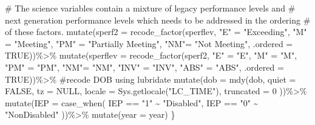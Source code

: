 \documentclass[
  letterpaper,
  DIV=11,
  numbers=noendperiod]{scrartcl}
\newenvironment{Shaded}{\begin{snugshade}}{\end{snugshade}}
\newcommand{\AttributeTok}[1]{\textcolor[rgb]{0.40,0.45,0.13}{#1}}
\newcommand{\CommentTok}[1]{\textcolor[rgb]{0.37,0.37,0.37}{#1}}
\newcommand{\ConstantTok}[1]{\textcolor[rgb]{0.56,0.35,0.01}{#1}}
\newcommand{\DecValTok}[1]{\textcolor[rgb]{0.68,0.00,0.00}{#1}}
\newcommand{\FunctionTok}[1]{\textcolor[rgb]{0.28,0.35,0.67}{#1}}
\newcommand{\NormalTok}[1]{\textcolor[rgb]{0.00,0.23,0.31}{#1}}
\newcommand{\OtherTok}[1]{\textcolor[rgb]{0.00,0.23,0.31}{#1}}
\newcommand{\SpecialCharTok}[1]{\textcolor[rgb]{0.37,0.37,0.37}{#1}}
\newcommand{\StringTok}[1]{\textcolor[rgb]{0.13,0.47,0.30}{#1}}
\begin{document}
\begin{Shaded}
\begin{Highlighting}[]
  \CommentTok{\# The science variables contain a mixture of legacy performance levels and}
  \CommentTok{\# next generation performance levels which needs to be addressed in the ordering}
  \CommentTok{\# of these factors.}
  \FunctionTok{mutate}\NormalTok{(}\AttributeTok{sperf2 =} \FunctionTok{recode\_factor}\NormalTok{(sperflev,}
                                   \StringTok{"E"} \OtherTok{=} \StringTok{"Exceeding"}\NormalTok{,}
                                   \StringTok{"M"} \OtherTok{=} \StringTok{"Meeting"}\NormalTok{,}
                                   \StringTok{"PM"} \OtherTok{=} \StringTok{"Partially Meeting"}\NormalTok{,}
                                   \StringTok{"NM"}\OtherTok{=} \StringTok{"Not Meeting"}\NormalTok{,}
                                  \AttributeTok{.ordered =} \ConstantTok{TRUE}\NormalTok{))}\SpecialCharTok{\%\textgreater{}\%}
  \FunctionTok{mutate}\NormalTok{(}\AttributeTok{sperflev =} \FunctionTok{recode\_factor}\NormalTok{(sperf2,}
                                   \StringTok{"E"} \OtherTok{=} \StringTok{"E"}\NormalTok{,}
                                   \StringTok{"M"} \OtherTok{=} \StringTok{"M"}\NormalTok{,}
                                   \StringTok{"PM"} \OtherTok{=} \StringTok{"PM"}\NormalTok{,}
                                   \StringTok{"NM"}\OtherTok{=} \StringTok{"NM"}\NormalTok{,}
                                   \StringTok{"INV"} \OtherTok{=} \StringTok{"INV"}\NormalTok{,}
                                   \StringTok{"ABS"} \OtherTok{=} \StringTok{"ABS"}\NormalTok{,}
                                  \AttributeTok{.ordered =} \ConstantTok{TRUE}\NormalTok{))}\SpecialCharTok{\%\textgreater{}\%}
  \CommentTok{\#recode DOB using lubridate}
  \FunctionTok{mutate}\NormalTok{(}\AttributeTok{dob =} \FunctionTok{mdy}\NormalTok{(dob,}
  \AttributeTok{quiet =} \ConstantTok{FALSE}\NormalTok{,}
  \AttributeTok{tz =} \ConstantTok{NULL}\NormalTok{,}
  \AttributeTok{locale =} \FunctionTok{Sys.getlocale}\NormalTok{(}\StringTok{"LC\_TIME"}\NormalTok{),}
  \AttributeTok{truncated =} \DecValTok{0}
\NormalTok{))}\SpecialCharTok{\%\textgreater{}\%}
  \FunctionTok{mutate}\NormalTok{(}\AttributeTok{IEP =} \FunctionTok{case\_when}\NormalTok{(}
\NormalTok{   IEP }\SpecialCharTok{==} \StringTok{"1"} \SpecialCharTok{\textasciitilde{}} \StringTok{"Disabled"}\NormalTok{,}
\NormalTok{    IEP }\SpecialCharTok{==} \StringTok{"0"} \SpecialCharTok{\textasciitilde{}} \StringTok{"NonDisabled"}
\NormalTok{  ))}\SpecialCharTok{\%\textgreater{}\%}
    \FunctionTok{mutate}\NormalTok{(}\AttributeTok{year =}\NormalTok{ year)}
\NormalTok{\}}
\end{Highlighting}
\end{Shaded}
\end{document}
